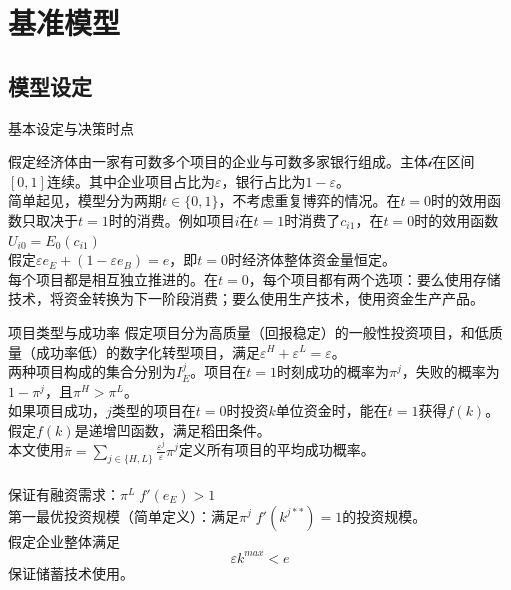 \documentclass{beamer}
\begin{document}
\section{基准模型}

\subsection{模型设定}

\begin{frame}{基本设定与决策时点}

	假定经济体由一家有可数多个项目的企业与可数多家银行组成。主体$\mathcal{i}$在区间$\left[ 0,1\right] $连续。其中企业项目占比为$\varepsilon$，银行占比为$1-\varepsilon$。\\
	简单起见，模型分为两期$t\in\{0,1\}$，不考虑重复博弈的情况。在$t=0$时的效用函数只取决于$t=1$时的消费。例如项目$i$在$t=1$时消费了$c_{i1}$，在$t=0$时的效用函数$U_{i0}=E_0\left(c_{i1}\right) $\\
	假定$\varepsilon e_{E}+(1-\varepsilon e_{B})=e$，即$t=0$时经济体整体资金量恒定。\\
	每个项目都是相互独立推进的。在$ t=0 $，每个项目都有两个选项：要么使用存储技术，将资金转换为下一阶段消费；要么使用生产技术，使用资金生产产品。

\end{frame}
\begin{frame}{项目类型与成功率}
	假定项目分为高质量（回报稳定）的一般性投资项目，和低质量（成功率低）的数字化转型项目，满足$\varepsilon^H+\varepsilon^L=\varepsilon$。
	\\两种项目构成的集合分别为$I_{E}^{j}$。项目在$t=1$时刻成功的概率为$\pi^j$，失败的概率为$1-\pi^j$，且$\pi^H>\pi^L$。
	\\如果项目成功，$j$类型的项目在$t=0$时投资$k$单位资金时，能在$t=1$获得$f(k)$。\\
	假定$f(k)$是递增凹函数，满足稻田条件。\\
	本文使用$\bar{\pi}=\sum_{j\in\{H,L\}} \frac{\varepsilon^j}{\varepsilon} \pi^j$定义所有项目的平均成功概率。\\~\\
	
	保证有融资需求：$\pi^L\;f'(e_E)>1$\\
	第一最优投资规模（简单定义）：满足$\pi^j\;f'(k^{j**})=1$的投资规模。\\
	假定企业整体满足
	$$\varepsilon k^{max}<e$$
	保证储蓄技术使用。
		
\end{frame}
\end{document}
